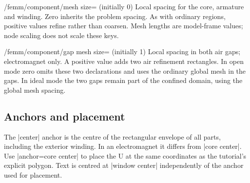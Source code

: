 \begin{key}{/femm/component/mesh size= (initially 0)}
Local spacing for the core, armature and winding. Zero inherits the problem
spacing. As with ordinary regions, positive values refine rather than coarsen.
Mesh lengths are model-frame values; node scaling does not scale these keys.
\end{key}
\begin{key}{/femm/component/gap mesh size= (initially 1)}
Local spacing in both air gaps; electromagnet only. A positive value adds
two air refinement rectangles. In open mode zero omits these two declarations and uses
the ordinary global mesh in the gaps. In ideal mode the two gaps remain
part of the confined domain, using the global mesh spacing.
\end{key}

\subsection{Anchors and placement}
The |center| anchor is the centre of the rectangular envelope of all parts,
including the exterior winding. In an electromagnet it differs from
|core center|. Use |anchor=core center| to place the U at the same coordinates
as the tutorial's explicit polygon. Text is centred at |window center|
independently of the anchor used for placement.

